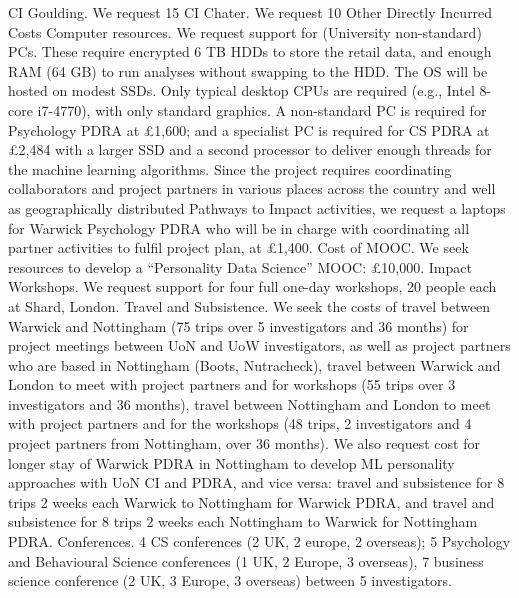 CI Goulding. We request 15%
CI Chater. We request 10%
Other Directly Incurred Costs
Computer resources. We request support for (University non-standard) PCs. These require encrypted 6 TB HDDs to store the retail data, and enough RAM (64 GB) to run analyses without swapping to the HDD. The OS will be hosted on modest SSDs. Only typical desktop CPUs are required (e.g., Intel 8-core i7-4770), with only standard graphics. A non-standard PC is required for Psychology PDRA at £1,600; and a specialist PC is required for CS PDRA at £2,484 with a larger SSD and a second processor to deliver enough threads for the machine learning algorithms. Since the project requires coordinating collaborators and project partners in various places across the country and well as geographically distributed Pathways to Impact activities, we request a laptops for Warwick Psychology PDRA who will be in charge with coordinating all partner activities to fulfil project plan, at £1,400. 
Cost of MOOC. We seek resources to develop a “Personality Data Science” MOOC: £10,000.  
Impact Workshops. We request support for four full one-day workshops, 20 people each at Shard, London.  
Travel and Subsistence. We seek the costs of travel between Warwick and Nottingham (75 trips over 5 investigators and 36 months) for project meetings between UoN and UoW investigators, as well as project partners who are based in Nottingham (Boots, Nutracheck), travel between Warwick and London to meet with project partners and for workshops (55 trips over 3 investigators and 36 months), travel between Nottingham and London to meet with project partners and for the workshops (48 trips, 2 investigators and 4 project partners from Nottingham, over 36 months). We also request cost for longer stay of Warwick PDRA in Nottingham to develop ML personality approaches with UoN CI and PDRA, and vice versa: travel and subsistence for 8 trips 2 weeks each Warwick to Nottingham for Warwick PDRA, and travel and subsistence for 8 trips 2 weeks each Nottingham to Warwick for Nottingham PDRA. 
Conferences. 4 CS conferences (2 UK, 2 europe, 2 overseas); 5 Psychology and Behavioural Science conferences (1 UK, 2 Europe, 3 overseas), 7 business science conference (2 UK, 3 Europe, 3 overseas) between 5 investigators. 



